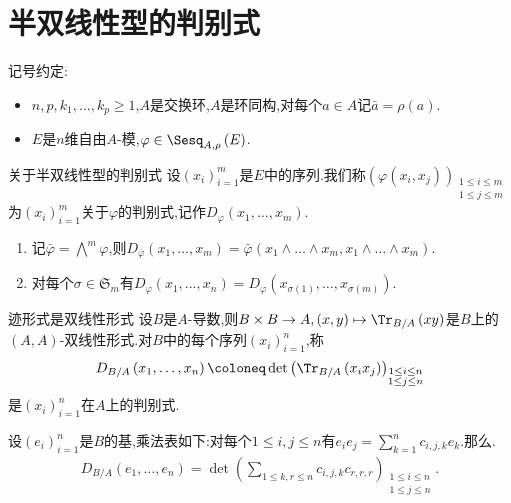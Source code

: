 \chapter{半双线性型的判别式}

记号约定:
\begin{itemize}
	\item $n,p,k_{1},\ldots,k_{p}\geq 1$,$A$是交换环,$A$是环同构,对每个$a\in A$记$\bar{a}=\rho\left(a\right)$.
	\item $E$是$n$维自由$A$-模,$\varphi\in\Sesq_{A,\rho}\left(E\right)$.
\end{itemize}

\begin{definition}{关于半双线性型的判别式}{}
	设$\left(x_{i}\right)_{i=1}^{m}$是$E$中的序列.我们称$\left(\varphi\left(x_{i},x_{j}\right)\right)_{\substack{1\leq i\leq m\\ 1\leq j\leq m}}$为$\left(x_{i}\right)_{i=1}^{m}$关于$\varphi$的判别式,记作$D_{\varphi}\left(x_{1},\ldots,x_{m}\right)$.
\end{definition}

\begin{remark}{}{}
	\begin{enumerate}
		\item 记$\bar{\varphi}=\bigwedge\limits^{m}\varphi$,则$D_{\bar{\varphi}}\left(x_{1},\ldots,x_{m}\right)=\bar{\varphi}\left(x_{1}\wedge\ldots\wedge x_{m},x_{1}\wedge\ldots\wedge x_{m}\right)$.
		\item 对每个$\sigma\in\mathfrak{S}_{m}$有$D_{\varphi}\left(x_{1},\ldots,x_{n}\right)=D_{\varphi}\left(x_{\sigma\left(1\right)},\ldots,x_{\sigma\left(m\right)}\right)$.
	\end{enumerate}
\end{remark}

\begin{example}{迹形式是双线性形式}{}
	设$B$是$A$-导数,则$B\times B\to A,\left(x,y\right)\mapsto\Tr_{B/A}\left(xy\right)$是$B$上的$\left(A,A\right)$-双线性形式.对$B$中的每个序列$\left(x_{i}\right)_{i=1}^{n}$,称
	\begin{align*}
		D_{B/A}\left(x_{1},\ldots,x_{n}\right)\coloneq\det\left(\Tr_{B/A}\left(x_{i}x_{j}\right)\right)_{\substack{1\leq i\leq n\\1\leq j\leq n}}
	\end{align*}
	是$\left(x_{i}\right)_{i=1}^{n}$在$A$上的判别式.
\end{example}

\begin{remark}{}{}
	设$\left(e_{i}\right)_{i=1}^{n}$是$B$的基,乘法表如下:对每个$1\leq i,j\leq n$有$e_{i}e_{j}=\sum\limits_{k=1}^{n}c_{i,j,k}e_{k}$.那么.
	\begin{align*}
		D_{B/A}\left(e_{1},\ldots,e_{n}\right)=\det\left(\sum\limits_{1\leq k,r\leq n}c_{i,j,k}c_{r,r,r}\right)_{\substack{1\leq i\leq n\\1\leq j\leq n}}.
	\end{align*}
\end{remark}

